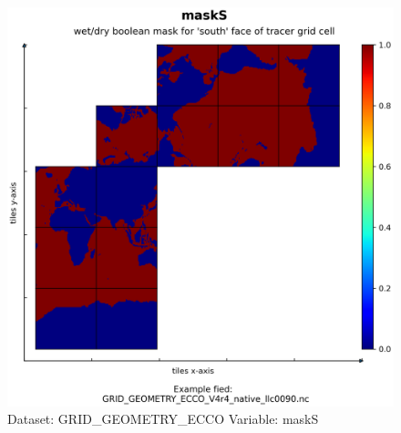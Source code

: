 \begin{figure}[H]
\centering
\includegraphics[width=\textwidth]{../images/plots/native_plots_coords/Geometry_Parameters_for_the_Lat-Lon-Cap_90_(llc90)_Native_Model_Grid_(Version_4_Release_4)/maskS.png}
\caption{Dataset: GRID\_GEOMETRY\_ECCO Variable: maskS}
\label{tab:table-GRID_GEOMETRY_ECCO_maskS-Plot}
\end{figure}